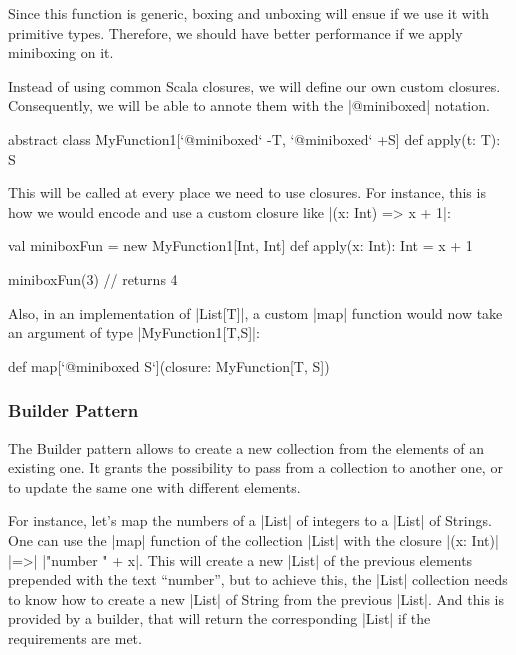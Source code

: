 Since this function is generic, boxing and unboxing will ensue if we use it with primitive types. Therefore, we should have better performance if we apply miniboxing on it.

Instead of using common Scala closures, we will define our own custom closures. Consequently, we will be able to annote them with the |@miniboxed| notation.

\begin{lstlisting-nobreak}
 abstract class MyFunction1[`@miniboxed` -T, `@miniboxed` +S] {
   def apply(t: T): S
 }
\end{lstlisting-nobreak}

This will be called at every place we need to use closures. For instance, this is how we would encode and use a custom closure like |(x: Int) => x + 1|:

\begin{lstlisting-nobreak}
 val miniboxFun = new MyFunction1[Int, Int] {
   def apply(x: Int): Int = x + 1
 }

 miniboxFun(3)   // returns 4
\end{lstlisting-nobreak}

Also, in an implementation of |List[T]|, a custom |map| function would now take an argument of type |MyFunction1[T,S]|:

\begin{lstlisting-nobreak}
 def map[`@miniboxed S`](closure: MyFunction[T, S])
\end{lstlisting-nobreak}

\subsubsection{Builder Pattern}

The Builder pattern allows to create a new collection from the elements of an existing one. It grants the possibility to pass from a collection to another one, or to update the same one with different elements.


For instance, let's map the numbers of a |List| of integers to a |List| of Strings. One can use the |map| function of the collection |List| with the closure |(x: Int)| |=>| |"number " + x|. This will create a new |List| of the previous elements prepended with the text ``number'', but to achieve this, the |List| collection needs to know how to create a new |List| of String from the previous |List|. And this is provided by a builder, that will return the corresponding |List| if the requirements are met.


